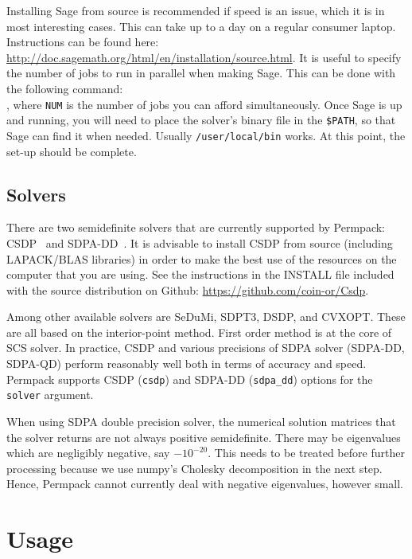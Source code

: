 \documentclass[12pt, a4paper, twoside]{report}
\begin{document}
Installing Sage from source is recommended if speed is an issue, which it is in most interesting cases. This can take up to a day on a regular consumer laptop. Instructions can be found here: \url{http://doc.sagemath.org/html/en/installation/source.html}. It is useful to specify the number of jobs to run in parallel when making Sage. This can be done with the following command:\\ , where \texttt{NUM} is the number of jobs you can afford simultaneously. Once Sage is up and running, you will need to place the solver's binary file in the \texttt{\$PATH}, so that Sage can find it when needed. Usually \texttt{/user/local/bin} works. At this point, the set-up should be complete.


\subsection{Solvers}
\label{sec:permpack-solvers}

There are two semidefinite solvers that are currently supported by Permpack: CSDP~\cite{csdp} and SDPA-DD~\cite{sdpa}. It is advisable to install CSDP from source (including LAPACK/BLAS libraries) in order to make the best use of the resources on the computer that you are using. See the instructions in the INSTALL file included with the source distribution on Github: \url{https://github.com/coin-or/Csdp}.

Among other available solvers are SeDuMi, SDPT3, DSDP, and CVXOPT. These are all based on the interior-point method. First order method is at the core of SCS solver. In practice, CSDP and various precisions of SDPA solver (SDPA-DD, SDPA-QD) perform reasonably well both in terms of accuracy and speed. Permpack supports CSDP (\texttt{csdp}) and SDPA-DD (\texttt{sdpa\_dd}) options for the \texttt{solver} argument.

\begin{note}
When using SDPA double precision solver, the numerical solution matrices that the solver returns are not always positive semidefinite. There may be eigenvalues which are negligibly negative, say $-10^{-20}$. This needs to be treated before further processing because we use numpy's Cholesky decomposition in the next step. Hence, Permpack cannot currently deal with negative eigenvalues, however small.
\end{note}

\section{Usage}
\label{sec:permpack-usage}
\end{document}
